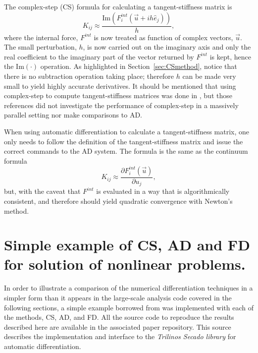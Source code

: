 \documentclass[preprint,12pt]{elsarticle}
\begin{document}
The complex-step (CS) formula for calculating a tangent-stiffness matrix is
%
\begin{equation} K_{ij} \approx \frac{\mbox{Im}(F_i^{int}(\vec{u} + i h
\hat{e}_j))}{h}, \end{equation}
%
where the internal force, $F^{int}$ is now treated as function of complex vectors,  $\vec{u}$. The small perturbation, $h$, is now carried out on the imaginary axis and only the real coefficient to the imaginary part of the vector returned by $F^{int}$ is kept, hence the $\mbox{Im}(\cdot)$ operation.  As highlighted in Section~\ref{sec:CSmethod}, notice that there is no subtraction operation taking place; therefore $h$ can be made very small to yield highly accurate derivatives. It should be mentioned that using complex-step to compute tangent-stiffness matrices was done in \cite{perez2000numerical,perez2012numerical}, but those references did not
investigate the performance of complex-step in a massively parallel setting nor make comparisons to AD. 

When using automatic differentiation to calculate a tangent-stiffness matrix, one only needs to follow the definition of the tangent-stiffness matrix and issue the correct commands to the AD system. The formula is the same as the continuum formula
%
\begin{equation} K_{ij} \approx \frac{\partial F_i^{int}(\vec{u})}{\partial u_j},
\end{equation}
%
but, with the caveat that $F^{int}$ is evaluated in a way that is algorithmically consistent, and therefore should yield quadratic convergence with Newton's method.

\section{Simple example of CS, AD and FD for solution of nonlinear problems.}
\label{subsec:Validation}

In order to illustrate a comparison of the numerical differentiation techniques in a simpler form than it appears in the large-scale analysis code covered in the following sections, a simple example borrowed from \cite{rezaiee2010dynamic} was implemented with each of the methods, CS, AD, and FD. All the source code to reproduce the results described here are available in the associated paper repository. This source describes the implementation and interface to the \emph{Trilinos Secado library} for automatic differentiation.
\end{document}

